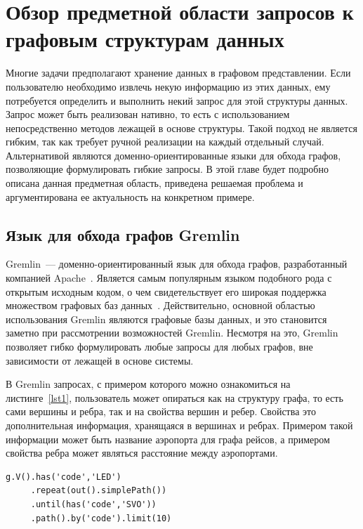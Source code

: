 \documentclass[times,specification,annotation]{itmo-student-thesis}
\begin{document}
\chapter{Обзор предметной области запросов к графовым структурам данных}

\startrelatedwork
Многие задачи предполагают хранение данных в графовом представлении. Если пользователю необходимо извлечь некую информацию из этих данных, ему потребуется определить и выполнить некий запрос для этой структуры данных. Запрос может быть реализован нативно, то есть с использованием непосредственно методов лежащей в основе структуры. Такой подход не является гибким, так как требует ручной реализации на каждый отдельный случай. Альтернативой являются доменно-ориентированные языки для обхода графов, позволяющие формулировать гибкие запросы. В этой главе будет подробно описана данная предметная область, приведена решаемая проблема и аргументирована ее актуальность на конкретном примере.

\section{Язык для обхода графов Gremlin}\label{gremlin}

Gremlin~--- доменно-ориентированный язык для обхода графов, разработанный компанией Apache~\cite{gremlin}. Является самым популярным языком подобного рода с открытым исходным кодом, о чем свидетельствует его широкая поддержка множеством графовых баз данных~\cite{tinkerpop-enabled}. Действительно, основной областью использования Gremlin являются графовые базы данных, и это становится заметно при рассмотрении возможностей Gremlin. Несмотря на это, Gremlin позволяет гибко формулировать любые запросы для любых графов, вне зависимости от лежащей в основе системы.

В Gremlin запросах, с примером которого можно ознакомиться на листинге~\ref{lst1}, пользователь может опираться как на структуру графа, то есть сами вершины и ребра, так и на свойства вершин и ребер. Свойства это дополнительная информация, хранящаяся в вершинах и ребрах. Примером такой информации может быть название аэропорта для графа рейсов, а примером свойства ребра может являться расстояние между аэропортами. 

\begin{lstlisting}[float=!h,caption={Пример запроса на Gremlin},label={lst1}]
g.V().has('code','LED')
     .repeat(out().simplePath())
     .until(has('code','SVO'))
     .path().by('code').limit(10)
\end{lstlisting}
\end{document}
